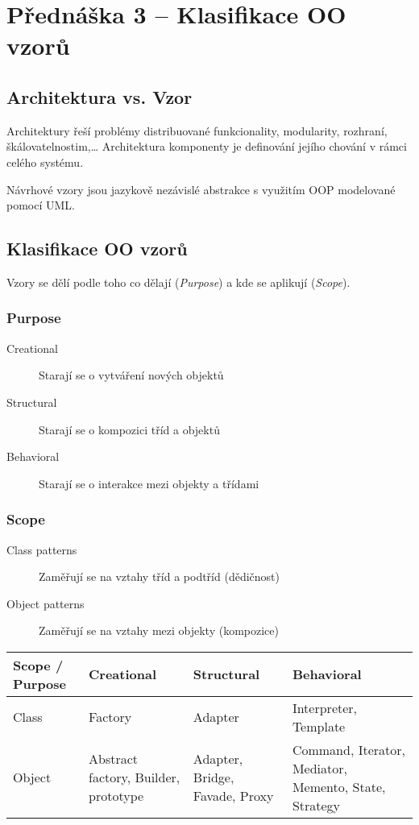 \section{Přednáška 3 -- Klasifikace OO vzorů}

\subsection{Architektura vs. Vzor}

Architektury řeší problémy distribuované funkcionality, modularity, rozhraní, škálovatelnostim,\dots
Architektura komponenty je definování jejího chování v rámci celého systému.

Návrhové vzory jsou jazykově nezávislé abstrakce s využitím OOP modelované pomocí UML.

\subsection{Klasifikace OO vzorů}

Vzory se dělí podle toho co dělají (\textit{Purpose}) a kde se aplikují (\textit{Scope}).

\subsubsection{Purpose}

\begin{description}
    \item[Creational] Starají se o vytváření nových objektů
    \item[Structural] Starají se o kompozici tříd a objektů
    \item[Behavioral] Starají se o interakce mezi objekty a třídami
\end{description}

\subsubsection{Scope}

\begin{description}
    \item[Class patterns] Zaměřují se na vztahy tříd a podtříd (dědičnost)
    \item[Object patterns] Zaměřují se na vztahy mezi objekty (kompozice)
\end{description}

\begin{tabular}{ | l || p{3.5cm} | p{3.5cm} | p{4.2cm} | }
    \hline
    Scope / Purpose & Creational & Structural & Behavioral \\ \hline \hline
    Class & Factory & Adapter & Interpreter, Template \\ \hline
    Object & Abstract factory, Builder, prototype & Adapter, Bridge, Favade, Proxy & Command, Iterator, Mediator, Memento, State, Strategy \\ \hline
\end{tabular}


